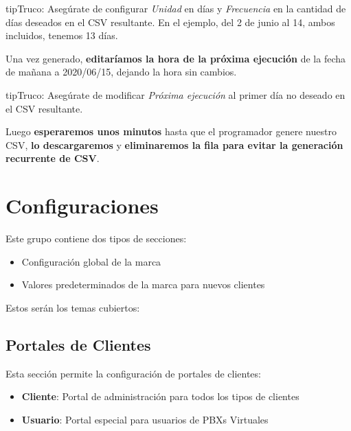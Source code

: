 \documentclass[letterpaper,10pt,spanish]{sphinxmanual}
\begin{document}
\begin{notice}{tip}{Truco:}
Asegúrate de configurar \emph{Unidad} en días y \emph{Frecuencia} en la cantidad de días deseados en el CSV resultante. En el ejemplo, del 2 de junio al 14, ambos incluidos, tenemos 13 días.
\end{notice}

Una vez generado, \textbf{editaríamos la hora de la próxima ejecución} de la fecha de mañana a 2020/06/15, dejando la hora sin cambios.

\begin{notice}{tip}{Truco:}
Asegúrate de modificar \emph{Próxima ejecución} al primer día no deseado en el CSV resultante.
\end{notice}

Luego \textbf{esperaremos unos minutos} hasta que el programador genere nuestro CSV, \textbf{lo descargaremos} y \textbf{eliminaremos la fila para evitar la generación recurrente de CSV}.


\section{Configuraciones}
\label{administration_portal/brand/settings/index::doc}\label{administration_portal/brand/settings/index:settings}
Este grupo contiene dos tipos de secciones:
\begin{itemize}
\item {} 
Configuración global de la marca

\item {} 
Valores predeterminados de la marca para nuevos clientes

\end{itemize}

Estos serán los temas cubiertos:
\label{administration_portal/brand/settings/client_portals:client-portals}

\subsection{Portales de Clientes}
\label{administration_portal/brand/settings/client_portals:client-portals}\label{administration_portal/brand/settings/client_portals:id2}\label{administration_portal/brand/settings/client_portals::doc}\label{administration_portal/brand/settings/client_portals:id1}
Esta sección permite la configuración de portales de clientes:
\begin{itemize}
\item {} 
\textbf{Cliente}: Portal de administración para todos los tipos de clientes

\item {} 
\textbf{Usuario}: Portal especial para usuarios de PBXs Virtuales

\end{itemize}
\end{document}
